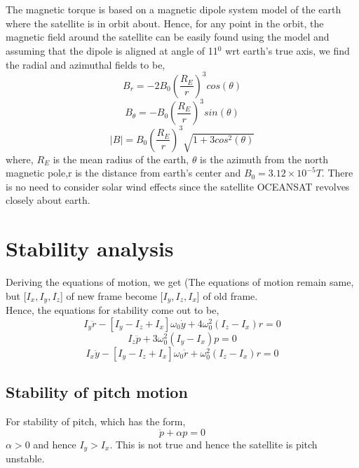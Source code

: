 \documentclass[10pt,a4paper]{report}
\begin{document}
\\ \\The magnetic torque is based on a magnetic dipole system model of the earth where the satellite is in orbit about. Hence, for any point in the orbit, the magnetic field around the satellite can be easily found using the model and assuming that the dipole is aligned at angle of 11$ ^{0} $ wrt earth's true axis, we find the radial and azimuthal fields to be,
\begin{equation}
B_{r}=-2B_{0}\left(\frac{R_{E}}{r}\right)^{3}cos(\theta)
\end{equation}
\begin{equation}
B_{\theta}=-B_{0}\left(\frac{R_{E}}{r}\right)^{3}sin(\theta)
\end{equation}
\begin{equation}
|B|=B_{0}\left(\frac{R_{E}}{r}\right)^{3}\sqrt{1+3cos^{2}(\theta)}
\end{equation}
where, $ R_{E} $ is the mean radius of the earth, $ \theta $ is the azimuth from the north magnetic pole,r is the distance from earth's center and $B_{0}=3.12\times10^{-5}T$. There is no need to consider solar wind effects since the satellite OCEANSAT revolves closely about earth.
\chapter{Stability analysis}
Deriving the equations of motion, we get (The equations of motion remain same, but [$I_{x},I_{y},I_{z}$] of new frame become [$I_{y},I_{z},I_{x}$] of old frame.\\
Hence, the equations for stability come out to be,
\begin{equation}
I_{y}\ddot{r}-[I_{y}-I_{z}+I_{x}]\omega_{0}\dot{y}+4\omega_{0}^{2}(I_{z}-I_{x})r=0
\end{equation}
\begin{equation}
I_{z}\ddot{p}+3\omega_{0}^{2}(I_{y}-I_{x})p=0
\end{equation}
\begin{equation}
I_{x}\ddot{y}-[I_{y}-I_{z}+I_{x}]\omega_{0}\dot{r}+\omega_{0}^{2}(I_{z}-I_{x})r=0
\end{equation}

\section{Stability of pitch motion}
For stability of pitch, which has the form,
\begin{equation}
\ddot{p}+\alpha p=0
\end{equation}
$ \alpha>0 $ and hence $ I_{y}>I_{x} $. This is not true and hence the satellite is pitch unstable.
\end{document}

